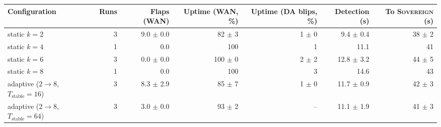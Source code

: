 \begin{tabular}{@{}lrrrrrr@{}}
\toprule
\textbf{Configuration} & \textbf{Runs} & \textbf{Flaps (WAN)} & \textbf{Uptime (WAN, \%)} & \textbf{Uptime (DA blips, \%)} & \textbf{Detection (s)} & \textbf{To \textsc{Sovereign} (s)} \\
\midrule
static $k{=}2$ & 3 & 9.0 $\pm$ 0.0 & 82 $\pm$ 3 & 1 $\pm$ 0 & 9.4 $\pm$ 0.4 & 38 $\pm$ 2 \\
static $k{=}4$ & 1 & 0.0 & 100 & 1 & 11.1 & 41 \\
static $k{=}6$ & 3 & 0.0 $\pm$ 0.0 & 100 $\pm$ 0 & 2 $\pm$ 2 & 12.8 $\pm$ 3.2 & 44 $\pm$ 5 \\
static $k{=}8$ & 1 & 0.0 & 100 & 3 & 14.6 & 43 \\
adaptive ($2\to8$, $T_{\text{stable}}{=}16$) & 3 & 8.3 $\pm$ 2.9 & 85 $\pm$ 7 & 1 $\pm$ 0 & 11.7 $\pm$ 0.9 & 42 $\pm$ 3 \\
adaptive ($2\to8$, $T_{\text{stable}}{=}64$) & 3 & 3.0 $\pm$ 0.0 & 93 $\pm$ 2 & -- & 11.1 $\pm$ 1.9 & 41 $\pm$ 3 \\
\bottomrule
\end{tabular}
